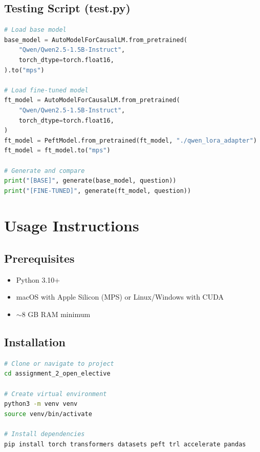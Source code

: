 \documentclass[12pt,a4paper]{article}
\begin{document}
\subsection{Testing Script (test.py)}

\begin{lstlisting}[language=Python, caption=Model Comparison Code]
# Load base model
base_model = AutoModelForCausalLM.from_pretrained(
    "Qwen/Qwen2.5-1.5B-Instruct",
    torch_dtype=torch.float16,
).to("mps")

# Load fine-tuned model
ft_model = AutoModelForCausalLM.from_pretrained(
    "Qwen/Qwen2.5-1.5B-Instruct",
    torch_dtype=torch.float16,
)
ft_model = PeftModel.from_pretrained(ft_model, "./qwen_lora_adapter")
ft_model = ft_model.to("mps")

# Generate and compare
print("[BASE]", generate(base_model, question))
print("[FINE-TUNED]", generate(ft_model, question))
\end{lstlisting}

\section{Usage Instructions}

\subsection{Prerequisites}

\begin{itemize}
    \item Python 3.10+
    \item macOS with Apple Silicon (MPS) or Linux/Windows with CUDA
    \item $\sim$8 GB RAM minimum
\end{itemize}

\subsection{Installation}

\begin{lstlisting}[language=bash, caption=Setup Commands]
# Clone or navigate to project
cd assignment_2_open_elective

# Create virtual environment
python3 -m venv venv
source venv/bin/activate

# Install dependencies
pip install torch transformers datasets peft trl accelerate pandas
\end{lstlisting}
\end{document}
